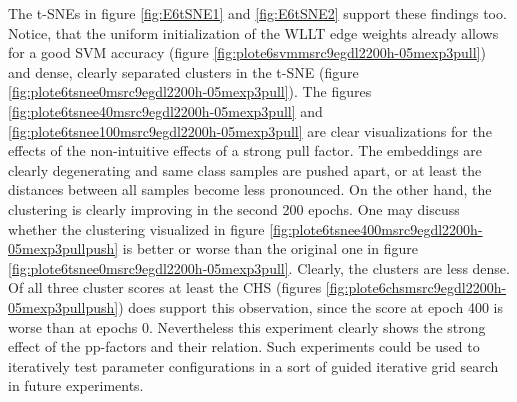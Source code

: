 		The t-SNEs in figure \ref{fig:E6tSNE1} and \ref{fig:E6tSNE2} support these findings too.
		Notice, that the uniform initialization of the WLLT edge weights already allows for a good SVM accuracy (figure \ref{fig:plote6svmmsrc9egdl2200h-05mexp3pull}) and dense, clearly separated clusters in the t-SNE (figure \ref{fig:plote6tsnee0msrc9egdl2200h-05mexp3pull}).
		The figures \ref{fig:plote6tsnee40msrc9egdl2200h-05mexp3pull} and \ref{fig:plote6tsnee100msrc9egdl2200h-05mexp3pull} are clear visualizations for the effects of the non-intuitive effects of a strong pull factor.
		The embeddings are clearly degenerating and same class samples are pushed apart, or at least the distances between all samples become less pronounced.
		On the other hand, the clustering is clearly improving in the second 200 epochs.
		One may discuss whether the clustering visualized in figure \ref{fig:plote6tsnee400msrc9egdl2200h-05mexp3pullpush} is better or worse than the original one in figure \ref{fig:plote6tsnee0msrc9egdl2200h-05mexp3pull}.
		Clearly, the clusters are less dense.
		Of all three cluster scores at least the CHS (figures \ref{fig:plote6chsmsrc9egdl2200h-05mexp3pullpush}) does support this observation, since the score at epoch 400 is worse than at epochs 0.
		Nevertheless this experiment clearly shows the strong effect of the pp-factors and their relation.
		Such experiments could be used to iteratively test parameter configurations in a sort of guided iterative grid search in future experiments.
				
